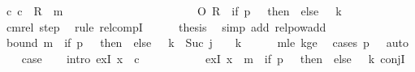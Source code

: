 \begin{isabellebody}
\ {\isachardoublequoteopen}{\isacharparenleft}{\kern0pt}c{}{\isacharcomma}{\kern0pt}\ c{\isacharprime}{\kern0pt}{\isacharparenright}{\kern0pt}\ {\isasymin}\ R{\isacharprime}{\kern0pt}\ {\isacharcircum}{\kern0pt}{\isacharcircum}{\kern0pt}\ m\isanewline
\ \ \ \ \ \ \ \ \ \ \ \ \ \ \ \ \ \ \ \ \ \ \ O\ R{\isacharprime}{\kern0pt}\ {\isacharcircum}{\kern0pt}{\isacharcircum}{\kern0pt}\ {\isacharparenleft}{\kern0pt}if\ {\isacharquery}{\kern0pt}p\ {\isacharequal}{\kern0pt}\ {}\ then\ {}\ else\ {}\ {\isacharasterisk}{\kern0pt}\ {\isacharquery}{\kern0pt}k{\isacharparenright}{\kern0pt}{\isachardoublequoteclose}\isanewline
\ \ \ \ \ \ \isamarkupfalse%
\ cm{\isacharunderscore}{\kern0pt}rel\ step\ \isamarkupfalse%
\ {\isacharparenleft}{\kern0pt}rule\ relcompI{\isacharparenright}{\kern0pt}\isanewline
\ \ \ \ \isamarkupfalse%
\ {\isacharquery}{\kern0pt}thesis\ \isamarkupfalse%
\ {\isacharparenleft}{\kern0pt}simp\ add{\isacharcolon}{\kern0pt}\ relpow{\isacharunderscore}{\kern0pt}add{\isacharparenright}{\kern0pt}\isanewline
\ \ \isamarkupfalse%
\isanewline
\ \ \isamarkupfalse%
\ bound{\isacharcolon}{\kern0pt}\ {\isachardoublequoteopen}m\ {\isacharplus}{\kern0pt}\ {\isacharparenleft}{\kern0pt}if\ {\isacharquery}{\kern0pt}p\ {\isacharequal}{\kern0pt}\ {}\ then\ {}\ else\ {}\ {\isacharasterisk}{\kern0pt}\ {\isacharquery}{\kern0pt}k{\isacharparenright}{\kern0pt}\ {\isasymle}\ Suc\ j\ {\isacharasterisk}{\kern0pt}\ {\isacharparenleft}{\kern0pt}{}\ {\isacharasterisk}{\kern0pt}\ {\isacharquery}{\kern0pt}k{\isacharparenright}{\kern0pt}{\isachardoublequoteclose}\isanewline
\ \ \ \ \isamarkupfalse%
\ m{\isacharunderscore}{\kern0pt}le\ kge{}\ \isamarkupfalse%
\ {\isacharparenleft}{\kern0pt}cases\ {\isachardoublequoteopen}{\isacharquery}{\kern0pt}p\ {\isacharequal}{\kern0pt}\ {}{\isachardoublequoteclose}{\isacharparenright}{\kern0pt}\ auto\isanewline
\ \ \isamarkupfalse%
\ {\isacharquery}{\kern0pt}case\isanewline
\ \ \isamarkupfalse%
\ {\isacharparenleft}{\kern0pt}intro\ exI{\isacharbrackleft}{\kern0pt}\ x\ {\isacharequal}{\kern0pt}\ c{\isacharprime}{\kern0pt}{\isacharbrackright}{\kern0pt}\isanewline
\ \ \ \ \ \ \ \ \ \ \ exI{\isacharbrackleft}{\kern0pt}\ x\ {\isacharequal}{\kern0pt}\ {\isachardoublequoteopen}m\ {\isacharplus}{\kern0pt}\ {\isacharparenleft}{\kern0pt}if\ {\isacharquery}{\kern0pt}p\ {\isacharequal}{\kern0pt}\ {}\ then\ {}\ else\ {}\ {\isacharasterisk}{\kern0pt}\ {\isacharquery}{\kern0pt}k{\isacharparenright}{\kern0pt}{\isachardoublequoteclose}{\isacharbrackright}{\kern0pt}\ conjI{\isacharparenright}{\kern0pt}\isanewline

\end{isabellebody}

